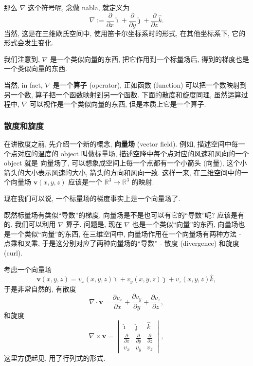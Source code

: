 那么 \(\nabla\) 这个符号呢, 念做 nabla, 就定义为 \[
\boxed{\nabla:=\frac{\partial}{\partial x}\hat{\imath}+\frac{\partial}{\partial y}\hat{\jmath}+\frac{\partial}{\partial z}\hat{k}.}
\] 当然, 这是在三维欧氏空间中, 使用笛卡尔坐标系时的形式, 在其他坐标系下,
它的形式会发生变化.

我们注意到, \(\nabla\) 是一个类似向量的东西, 把它作用到一个标量场后,
得到的梯度也是一个类似向量的东西.

\begin{newquote}
当然, in fact, \(\nabla\) 是一个\textbf{算子} (operator), 正如函数
(function) 可以把一个数映射到另一个数, 算子把一个函数映射到另一个函数.
下面的散度和旋度同理, 虽然运算过程中, \(\nabla\)
可以视作是一个类似向量的东西, 但是本质上它是一个算子.
\end{newquote}

\subsubsection{散度和旋度}

在讲散度之前, 先介绍一个新的概念, \textbf{向量场} (vector field). 例如,
描述空间中每一个点对应的温度的 object 叫做标量场,
描述空降中每个点对应的风速和风向的一个 object 就是 向量场了,
可以想象成空间上每一个点都有一个小箭头 (向量),
这个小箭头的大小表示风速的大小, 箭头的方向和风向一致. 这样一来,
在三维空间中的一个向量场 \(\boldsymbol{v}(x,y,z)\) 应该是一个
\(\mathbb{R}^3\rightarrow\mathbb{R}^3\) 的映射.

\begin{newquote}
现在我们可以说, 一个标量场的梯度事实上是一个向量场了.
\end{newquote}

既然标量场有类似``导数''的梯度, 向量场是不是也可以有它的``导数''呢?
应该是有的, 我们可以利用 \(\nabla\) 算子. 问题是, 现在 \(\nabla\)
也是一个类似``向量''的东西, 向量场也是一个类似``向量''的东西,
在三维空间中, 向量场作用在一个向量场有两种方法 - 点乘和叉乘,
于是这分别对应了两种向量场的``导数'' - 散度 (divergence) 和旋度 (curl).

考虑一个向量场 \[
\boldsymbol{v}(x,y,z)=v_x(x,y,z)\hat{\imath}+v_y(x,y,z)\hat{\jmath}+v_z(x,y,z)\hat{k},
\] 于是非常自然的, 有散度 \[
\boxed{\nabla\cdot\boldsymbol{v}=\frac{\partial v_x}{\partial x}+\frac{\partial v_y}{\partial y}+\frac{\partial v_z}{\partial z},}
\] 和旋度 \[
\boxed{\nabla\times\boldsymbol{v}=\begin{vmatrix}\hat{\imath}&\hat{\jmath}&\hat{k}\\\frac{\partial}{\partial x}&\frac{\partial}{\partial y}&\frac{\partial}{\partial z}\\v_x&v_y&v_z\end{vmatrix},}
\] 这里方便起见, 用了行列式的形式.

